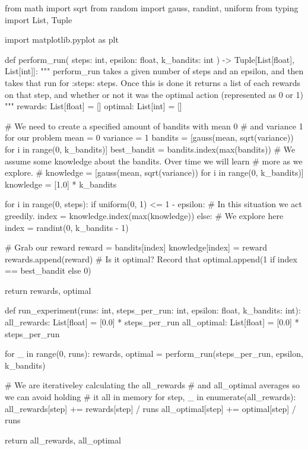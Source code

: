 \documentclass{article}
\begin{document}
\begin{python}
from math import sqrt
from random import gauss, randint, uniform
from typing import List, Tuple

import matplotlib.pyplot as plt


def perform_run(
    steps: int, epsilon: float, k_bandits: int
) -> Tuple[List[float], List[int]]:
    """
    perform_run takes a given number of steps and an epsilon, and then takes
    that run for :steps: steps. Once this is done it returns a list of each
    rewards on that step, and whether or not it was the optimal action
    (represented as 0 or 1)
    """
    rewards: List[float] = []
    optimal: List[int] = []

    # We need to create a specified amount of bandits with mean 0
    # and variance 1 for our problem
    mean = 0
    variance = 1
    bandits = [gauss(mean, sqrt(variance)) for i in range(0, k_bandits)]
    best_bandit = bandits.index(max(bandits))
    # We assume some knowledge about the bandits. Over time we will learn
    # more as we explore.
    # knowledge = [gauss(mean, sqrt(variance)) for i in range(0, k_bandits)]
    knowledge = [1.0] * k_bandits

    for i in range(0, steps):
        if uniform(0, 1) <= 1 - epsilon:
            # In this situation we act greedily.
            index = knowledge.index(max(knowledge))
        else:
            # We explore here
            index = randint(0, k_bandits - 1)

        # Grab our reward
        reward = bandits[index]
        knowledge[index] = reward
        rewards.append(reward)
        # Is it optimal? Record that
        optimal.append(1 if index == best_bandit else 0)

    return rewards, optimal


def run_experiment(runs: int, steps_per_run: int, epsilon: float, k_bandits: int):
    all_rewards: List[float] = [0.0] * steps_per_run
    all_optimal: List[float] = [0.0] * steps_per_run

    for _ in range(0, runs):
        rewards, optimal = perform_run(steps_per_run, epsilon, k_bandits)

        # We are iterativeley calculating the all_rewards
        # and all_optimal averages so we can avoid holding
        # it all in memory
        for step, _ in enumerate(all_rewards):
            all_rewards[step] += rewards[step] / runs
            all_optimal[step] += optimal[step] / runs

    return all_rewards, all_optimal



\end{python}
\end{document}
